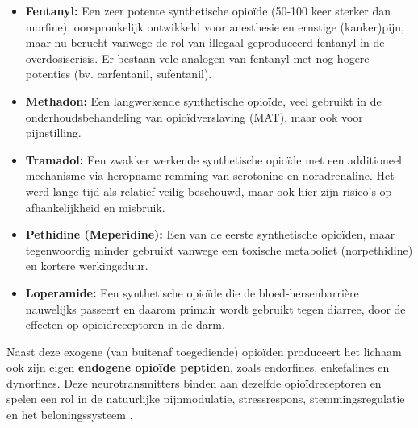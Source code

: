 \documentclass[11pt, a4paper]{report} %
\begin{document}
\begin{itemize}
        \begin{itemize}
            \item \textbf{Fentanyl:} Een zeer potente synthetische opioïde (50-100 keer sterker dan morfine), oorspronkelijk ontwikkeld voor anesthesie en ernstige (kanker)pijn, maar nu berucht vanwege de rol van illegaal geproduceerd fentanyl in de overdosiscrisis. Er bestaan vele analogen van fentanyl met nog hogere potenties (bv. carfentanil, sufentanil).
            \item \textbf{Methadon:} Een langwerkende synthetische opioïde, veel gebruikt in de onderhoudsbehandeling van opioïdverslaving (MAT), maar ook voor pijnstilling.
            \item \textbf{Tramadol:} Een zwakker werkende synthetische opioïde met een additioneel mechanisme via heropname-remming van serotonine en noradrenaline. Het werd lange tijd als relatief veilig beschouwd, maar ook hier zijn risico's op afhankelijkheid en misbruik.
            \item \textbf{Pethidine (Meperidine):} Een van de eerste synthetische opioïden, maar tegenwoordig minder gebruikt vanwege een toxische metaboliet (norpethidine) en kortere werkingsduur.
            \item \textbf{Loperamide:} Een synthetische opioïde die de bloed-hersenbarrière nauwelijks passeert en daarom primair wordt gebruikt tegen diarree, door de effecten op opioïdreceptoren in de darm.
        \end{itemize}
\end{itemize}
Naast deze exogene (van buitenaf toegediende) opioïden produceert het lichaam ook zijn eigen \textbf{endogene opioïde peptiden}, zoals endorfines, enkefalines en dynorfines. Deze neurotransmitters binden aan dezelfde opioïdreceptoren en spelen een rol in de natuurlijke pijnmodulatie, stressrespons, stemmingsregulatie en het beloningssysteem \parencite{StatPearlsOpioidReceptor}.
\end{document}
